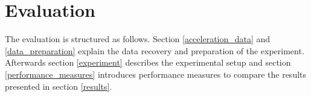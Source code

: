 \section{Evaluation} \label{evaluation}

The evaluation is structured as follows. Section \ref{acceleration_data} and \ref{data_preparation} explain the data
recovery and preparation of the experiment. Afterwards section \ref{experiment} describes the experimental setup and
section \ref{performance_measures} introduces performance measures to compare the results presented in section
\ref{results}.





%
